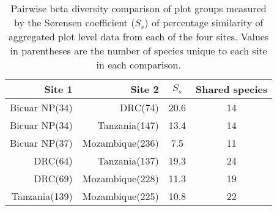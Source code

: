 
\begin{table}[!htbp] \centering 
  	\caption[Pairwise S\o{}rensen coefficient of similarity among sites]{Pairwise beta diversity comparison of plot groups measured by the S\o{}rensen coefficient ($S_s$) of percentage similarity of aggregated plot level data from each of the four sites. Values in parentheses are the number of species unique to each site in each comparison.} 
  \label{bicuar:site_pairs_js} 
\begin{tabular}{rrcc} 
	\hline
Site 1 & Site 2 & $S_s$ & Shared species \\
	\hline
Bicuar NP(34) & DRC(74) & 20.6 & 14 \\ 
Bicuar NP(34) & Tanzania(147) & 13.4 & 14 \\ 
Bicuar NP(37) & Mozambique(236) & 7.5 & 11 \\ 
DRC(64) & Tanzania(137) & 19.3 & 24 \\ 
DRC(69) & Mozambique(228) & 11.3 & 19 \\ 
Tanzania(139) & Mozambique(225) & 10.8 & 22 \\ 
	\hline
\end{tabular} 
\end{table} 
